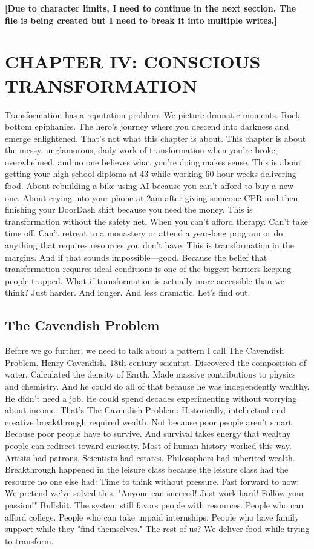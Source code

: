\textbf{[Due to character limits, I need to continue in the next section. The file is being created but I need to break it into multiple writes.]}

\chapter{CHAPTER IV: CONSCIOUS TRANSFORMATION}

Transformation has a reputation problem.
We picture dramatic moments. Rock bottom epiphanies. The hero's journey where you descend into darkness and emerge enlightened.
That's not what this chapter is about.
This chapter is about the messy, unglamorous, daily work of transformation when you're broke, overwhelmed, and no one believes what you're doing makes sense.
This is about getting your high school diploma at 43 while working 60-hour weeks delivering food. About rebuilding a bike using AI because you can't afford to buy a new one. About crying into your phone at 2am after giving someone CPR and then finishing your DoorDash shift because you need the money.
This is transformation without the safety net.
When you can't afford therapy. Can't take time off. Can't retreat to a monastery or attend a year-long program or do anything that requires resources you don't have.
This is transformation in the margins.
And if that sounds impossible—good. Because the belief that transformation requires ideal conditions is one of the biggest barriers keeping people trapped.
What if transformation is actually more accessible than we think? Just harder. And longer. And less dramatic.
Let's find out.

\section{The Cavendish Problem}

Before we go further, we need to talk about a pattern I call The Cavendish Problem.
Henry Cavendish. 18th century scientist. Discovered the composition of water. Calculated the density of Earth. Made massive contributions to physics and chemistry.
And he could do all of that because he was independently wealthy. He didn't need a job. He could spend decades experimenting without worrying about income.
That's The Cavendish Problem: Historically, intellectual and creative breakthrough required wealth.
Not because poor people aren't smart. Because poor people have to survive. And survival takes energy that wealthy people can redirect toward curiosity.
Most of human history worked this way.
Artists had patrons. Scientists had estates. Philosophers had inherited wealth. Breakthrough happened in the leisure class because the leisure class had the resource no one else had: Time to think without pressure.
Fast forward to now:
We pretend we've solved this. "Anyone can succeed! Just work hard! Follow your passion!"
Bullshit.
The system still favors people with resources. People who can afford college. People who can take unpaid internships. People who have family support while they "find themselves."
The rest of us? We deliver food while trying to transform.

